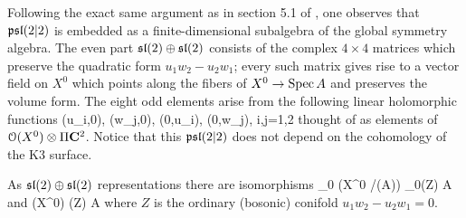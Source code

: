 \documentclass[../main.tex]{subfiles}
\begin{document}
Following the exact same argument as in section 5.1 of \cite{CP}, one observes that $\mathfrak{psl}(2|2)$ is embedded as a finite-dimensional subalgebra of the global symmetry algebra.
The even part $\mathfrak{sl}(2) \oplus \mathfrak{sl}(2)$ consists of the complex $4 \times 4$ matrices which preserve the quadratic form $u_1 w_2 - u_2 w_1$; every such matrix gives rise to a vector field on $X^0$ which points along the fibers of $X^0 \to \operatorname{Spec} A$ and preserves the volume form.
The eight odd elements arise from the following linear holomorphic functions 
\beqn
(u_i,0), (w_j,0), (0,u_i), (0,w_j), \quad i,j=1,2
\eeqn
thought of as elements of $\mathcal O(X^0) \otimes \Pi \mathbf{C}^2$.
Notice that this $\mathfrak{psl}(2|2)$ does not depend on the cohomology of the K3 surface.

As $\mathfrak{sl}(2) \oplus \mathfrak{sl}(2)$ representations there are isomorphisms
\beqn
{}_0 \left(X^0 \slash \Spec(A)\right) \cong {}_0(Z) \otimes A \\
\eeqn
and
\beqn
\cO(X^0) \cong \cO(Z) \otimes A
\eeqn
where $Z$ is the ordinary (bosonic) conifold $u_1 w_2 - u_2 w_1 = 0$.
\end{document}
